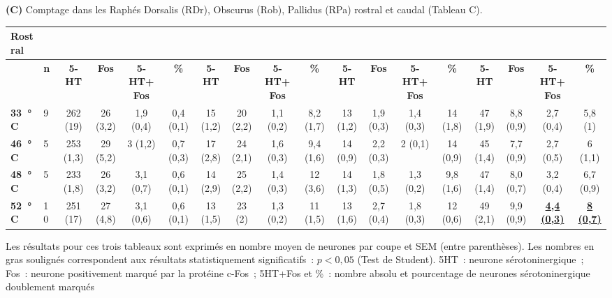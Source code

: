 {{\protect\parbox[t]{25cm}{\singlespacing
\begin{small}
\textbf{(C)} Comptage dans les Raphés Dorsalis (RDr), Obscurus (Rob), Pallidus (RPa) rostral et caudal (Tableau C).
\end{small}}}
\begin{scriptsize}
\begin{center}
\begin{tabular}[c]{||BBc|c|c|c|c|c|c|c|c|c|c|c|c|c|c|c||}\hline\hline
Rostral		&  		&  						&  						& 					& \\\hline
 		& \textbf{n} 	& \textbf{5-HT} & \textbf{Fos} 	& \textbf{5-HT+Fos} 	& \textbf{\%} 	& \textbf{5-HT} & \textbf{Fos} 	& \textbf{5-HT+Fos} 	& \textbf{\%} 		& \textbf{5-HT} & \textbf{Fos} 	& \textbf{5-HT+Fos} 	& \textbf{\%} 	& \textbf{5-HT} & \textbf{Fos}    & \textbf{5-HT+Fos}				& \textbf{\%}	\\\hline
\textbf{33~°C} 	& 9 		& 262 (19) 	& 26 (3,2)	& 1,9 (0,4)		& 0,4 (0,1)	& 15 (1,2) 	& 20 (2,2) 	& 1,1 (0,2) 		& 8,2 (1,7) 		& 13 (1,2) 	& 1,9 (0,3) 	& 1,4 (0,3) 		& 14 (1,8) 	& 47 (1,9) 	& 8,8 (0,9) 	  & 2,7 (0,4)					& 5,8 (1)	\\\hline
\textbf{46~°C} 	& 5 		& 253 (1,3) 	& 29 (5,2) 	& 3 (1,2)		& 0,7 (0,3)	& 17 (2,8) 	& 24 (2,1) 	& 1,6 (0,3) 		& 9,4 (1,6) 		& 14 (0,9) 	& 2,2 (0,3) 	& 2 (0,1) 		& 14 (0,9)	& 45 (1,4) 	& 7,7 (0,9) 	  & 2,7 (0,5) 					& 6 (1,1)	\\\hline
\textbf{48~°C} 	& 5 		& 233 (1,8) 	& 26 (3,2)	& 3,1 (0,7) 		& 0,6 (0,1) 	& 14 (2,9) 	& 25 (2,2) 	& 1,4 (0,3)		& 12 (3,6) 		& 14 (1,3) 	& 1,8 (0,5) 	& 1,3 (0,2) 		& 9,8 (1,6) 	& 47 (1,4) 	&  8,0 (0,7)	  &  3,2 (0,4)					& 6,7 (0,9) 	\\\hline
\textbf{52~°C} 	& 10 		& 251 (17) 	& 27 (4,8) 	& 3,1 (0,6) 		& 0,6 (0,1) 	& 13 (1,5) 	& 23 (2) 	&  1,3 (0,2) 		&  11 (1,5)  		& 13 (1,6) 	& 2,7 (0,4) 	&  1,8 (0,3)  		&  12 (0,6)  	& 49 (2,1)   	&  9,9 (0,9)   	  &  \underline{\textbf{4,4 (0,3)}} 	  	&  \underline{\textbf{8 (0,7)}}	\\\hline\hline
\end{tabular}
\end{center}
\end{scriptsize}


{\protect\parbox[t]{25cm}{
\begin{scriptsize}
\singlespacing
\noindent Les résultats pour ces trois tableaux sont exprimés en nombre moyen de neurones par coupe et SEM (entre parenthèses). Les nombres en gras soulignés correspondent aux résultats statistiquement significatifs : $p < 0,05$ (Test de Student). 5HT~: neurone sérotoninergique~; Fos~: neurone positivement marqué par la protéine c-Fos~; 5HT+Fos et \%~: nombre absolu et pourcentage de neurones sérotoninergique doublement marqués
\end{scriptsize}}}
}

%
